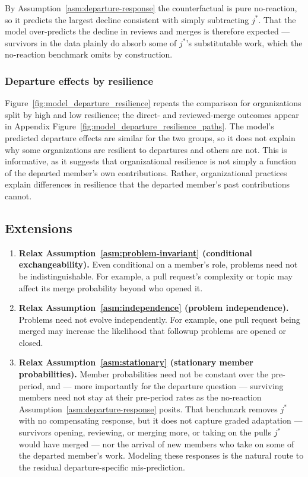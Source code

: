 \documentclass[12pt,notitlepage]{article}
\begin{document}
By Assumption~\ref{asm:departure-response} the counterfactual is pure no-reaction, so it predicts the largest decline consistent with simply subtracting $j^*$.
That the model over-predicts the decline in reviews and merges is therefore expected --- survivors in the data plainly do absorb some of $j^*$'s substitutable work, which the no-reaction benchmark omits by construction.

\subsubsection{Departure effects by resilience}

Figure~\ref{fig:model_departure_resilience} repeats the comparison for organizations split by high and low resilience; the direct- and reviewed-merge outcomes appear in Appendix Figure~\ref{fig:model_departure_resilience_paths}.
The model's predicted departure effects are similar for the two groups, so it does not explain why some organizations are resilient to departures and others are not.
This is informative, as it suggests that organizational resilience is not simply a function of the departed member's own contributions.
Rather, organizational practices explain differences in resilience that the departed member's past contributions cannot.

\subsection{Extensions}

\begin{enumerate}
    \item \textbf{Relax Assumption~\ref{asm:problem-invariant} (conditional exchangeability).} Even conditional on a member's role, problems need not be indistinguishable. For example, a pull request's complexity or topic may affect its merge probability beyond who opened it.

    \item \textbf{Relax Assumption~\ref{asm:independence} (problem independence).} Problems need not evolve independently. For example, one pull request being merged may increase the likelihood that followup problems are opened or closed.

    \item \textbf{Relax Assumption~\ref{asm:stationary} (stationary member probabilities).} Member probabilities need not be constant over the pre-period, and --- more importantly for the departure question --- surviving members need not stay at their pre-period rates as the no-reaction Assumption~\ref{asm:departure-response} posits. That benchmark removes $j^*$ with no compensating response, but it does not capture graded adaptation --- survivors opening, reviewing, or merging more, or taking on the pulls $j^*$ would have merged --- nor the arrival of new members who take on some of the departed member's work. Modeling these responses is the natural route to the residual departure-specific mis-prediction.
\end{enumerate}
\end{document}
